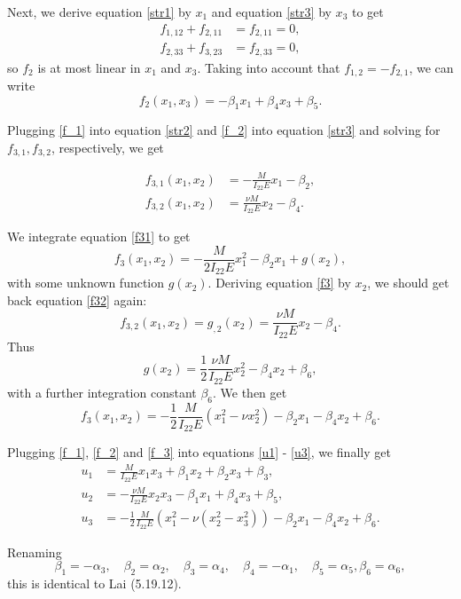 \documentclass{article}
\newcommand{\ee}{\end{equation}}
\newcommand{\be}{\begin{equation}}
\begin{document}
\begin{enumerate}
Next, we derive equation \eqref{str1} by $x_1$ and equation \eqref{str3} by $x_3$ to get
\begin{align}
f_{1,12} + f_{2,11} &= f_{2,11} = 0,\\
f_{2,33} + f_{3,23} &= f_{2,33} = 0,
\end{align}
so $f_2$ is at most linear in $x_1$ and $x_3$. Taking into account that $f_{1,2} = -f_{2,1}$, we can write
\be
f_2(x_1,x_3) = -\beta_1 x_1 + \beta_4 x_3 + \beta_5.
\label{f_2}
\ee

Plugging \eqref{f_1} into equation \eqref{str2} and \eqref{f_2} into equation \eqref{str3} and solving for $f_{3,1}, f_{3,2}$, respectively, we get

\begin{align}
f_{3,1}(x_1,x_2) &= -\frac{M}{I_{22}E}x_1 - \beta_2, \label{f31} \\
f_{3,2}(x_1,x_2) &= \frac{\nu M}{I_{22}E}x_2 - \beta_4. \label{f32}
\end{align}

We integrate equation \eqref{f31} to get
\be
f_3(x_1,x_2) = -\frac{M}{2I_{22}E}x_1^2 - \beta_2 x_1 + g(x_2), \label{f3}
\ee
with some unknown function $g(x_2)$. Deriving equation \eqref{f3} by $x_2$, we should get back equation \eqref{f32} again:
\be
f_{3,2}(x_1,x_2) = g_{,2}(x_2) = \frac{\nu M}{I_{22}E}x_2 - \beta_4.
\ee
Thus
\be
g(x_2) = \frac{1}{2} \frac{\nu M}{I_{22}E} x_2^2 - \beta_4 x_2 + \beta_6,
\ee
with a further integration constant $\beta_6$. We then get
\be
f_3(x_1,x_2) = -\frac{1}{2} \frac{M}{I_{22}E}(x_1^2 - \nu x_2^2) - \beta_2 x_1 - \beta_4 x_2 + \beta_6.
\label{f_3}
\ee

Plugging \eqref{f_1}, \eqref{f_2} and \eqref{f_3} into equations \eqref{u1} - \eqref{u3}, we finally get
\begin{align}
u_1 &= \frac{M}{I_{22}E}x_1x_3 + \beta_1 x_2 + \beta_2 x_3 + \beta_3, \\
u_2 &= -\frac{\nu M}{I_{22}E}x_2x_3 -\beta_1 x_1 + \beta_4 x_3 + \beta_5, \\
u_3 &= -\frac{1}{2} \frac{M}{I_{22}E}\left(x_1^2 - \nu(x_2^2 - x_3^2)\right) - \beta_2 x_1 - \beta_4 x_2 + \beta_6.
\end{align}

Renaming
\be
\beta_1 = -\alpha_3, \quad \beta_2 = \alpha_2, \quad \beta_3 = \alpha_4, \quad \beta_4 = -\alpha_1, \quad \beta_5 = \alpha_5, \beta_6 = \alpha_6,
\ee
this is identical to Lai (5.19.12).
\end{enumerate}
\end{document}
